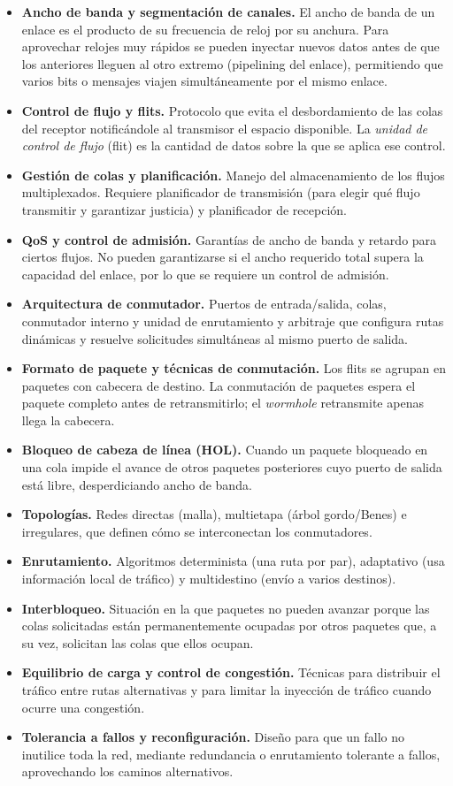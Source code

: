 \documentclass[12pt,a4paper]{article}
\begin{document}
\begin{itemize}
    \item \textbf{Ancho de banda y segmentación de canales.} El ancho de banda de un enlace es el producto de su frecuencia de reloj por su anchura. Para aprovechar relojes muy rápidos se pueden inyectar nuevos datos antes de que los anteriores lleguen al otro extremo (pipelining del enlace), permitiendo que varios bits o mensajes viajen simultáneamente por el mismo enlace.
    \item \textbf{Control de flujo y flits.} Protocolo que evita el desbordamiento de las colas del receptor notificándole al transmisor el espacio disponible. La \emph{unidad de control de flujo} (flit) es la cantidad de datos sobre la que se aplica ese control.
    \item \textbf{Gestión de colas y planificación.} Manejo del almacenamiento de los flujos multiplexados. Requiere planificador de transmisión (para elegir qué flujo transmitir y garantizar justicia) y planificador de recepción.
    \item \textbf{QoS y control de admisión.} Garantías de ancho de banda y retardo para ciertos flujos. No pueden garantizarse si el ancho requerido total supera la capacidad del enlace, por lo que se requiere un control de admisión.
    \item \textbf{Arquitectura de conmutador.} Puertos de entrada/salida, colas, conmutador interno y unidad de enrutamiento y arbitraje que configura rutas dinámicas y resuelve solicitudes simultáneas al mismo puerto de salida.
    \item \textbf{Formato de paquete y técnicas de conmutación.} Los flits se agrupan en paquetes con cabecera de destino. La conmutación de paquetes espera el paquete completo antes de retransmitirlo; el \emph{wormhole} retransmite apenas llega la cabecera.
    \item \textbf{Bloqueo de cabeza de línea (HOL).} Cuando un paquete bloqueado en una cola impide el avance de otros paquetes posteriores cuyo puerto de salida está libre, desperdiciando ancho de banda.
    \item \textbf{Topologías.} Redes directas (malla), multietapa (árbol gordo/Benes) e irregulares, que definen cómo se interconectan los conmutadores.
    \item \textbf{Enrutamiento.} Algoritmos determinista (una ruta por par), adaptativo (usa información local de tráfico) y multidestino (envío a varios destinos).
    \item \textbf{Interbloqueo.} Situación en la que paquetes no pueden avanzar porque las colas solicitadas están permanentemente ocupadas por otros paquetes que, a su vez, solicitan las colas que ellos ocupan.
    \item \textbf{Equilibrio de carga y control de congestión.} Técnicas para distribuir el tráfico entre rutas alternativas y para limitar la inyección de tráfico cuando ocurre una congestión.
    \item \textbf{Tolerancia a fallos y reconfiguración.} Diseño para que un fallo no inutilice toda la red, mediante redundancia o enrutamiento tolerante a fallos, aprovechando los caminos alternativos.
\end{itemize}
\end{document}
